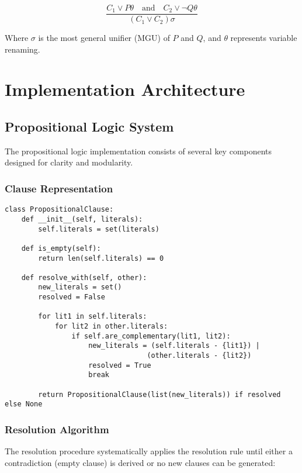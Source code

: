\documentclass[11pt,a4paper]{article}
\begin{document}
\begin{equation}
\frac{C_1 \vee P\theta \quad \text{and} \quad C_2 \vee \neg Q\theta}{(C_1 \vee C_2)\sigma}
\end{equation}

Where $\sigma$ is the most general unifier (MGU) of $P$ and $Q$, and $\theta$ represents variable renaming.

\section{Implementation Architecture}

\subsection{Propositional Logic System}

The propositional logic implementation consists of several key components designed for clarity and modularity.

\subsubsection{Clause Representation}

\begin{lstlisting}[caption=Propositional Clause Implementation]
class PropositionalClause:
    def __init__(self, literals):
        self.literals = set(literals)
    
    def is_empty(self):
        return len(self.literals) == 0
    
    def resolve_with(self, other):
        new_literals = set()
        resolved = False
        
        for lit1 in self.literals:
            for lit2 in other.literals:
                if self.are_complementary(lit1, lit2):
                    new_literals = (self.literals - {lit1}) | 
                                  (other.literals - {lit2})
                    resolved = True
                    break
        
        return PropositionalClause(list(new_literals)) if resolved else None
\end{lstlisting}

\subsubsection{Resolution Algorithm}

The resolution procedure systematically applies the resolution rule until either a contradiction (empty clause) is derived or no new clauses can be generated:
\end{document}
